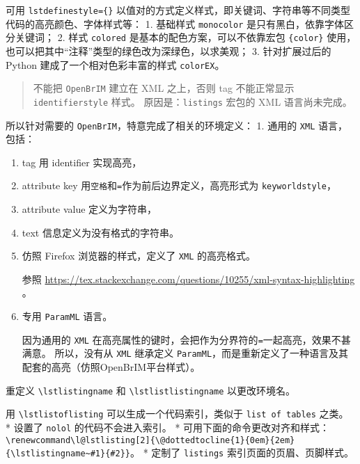 \documentclass[../Main/thesis.tex]{subfiles}
\begin{document}
可用 \texttt{lstdefinestyle=\{\}}
以值对的方式定义样式，即关键词、字符串等不同类型代码的高亮颜色、字体样式等：
1. 基础样式 \texttt{monocolor} 是只有黑白，依靠字体区分关键词； 2. 样式
\texttt{colored} 是基本的配色方案，可以不依靠宏包 \texttt{\{color\}}
使用，也可以把其中``注释''类型的绿色改为深绿色，以求美观； 3.
针对扩展过后的 Python 建成了一个相对色彩丰富的样式 \texttt{colorEX}。

\begin{quote}
不能把 \texttt{OpenBrIM} 建立在 XML 之上，否则 tag 不能正常显示
\texttt{identifierstyle} 样式。 原因是：\texttt{listings} 宏包的 XML
语言尚未完成。
\end{quote}

所以针对需要的 \texttt{OpenBrIM}，特意完成了相关的环境定义： 1. 通用的
\texttt{XML} 语言，包括：

\begin{enumerate}
\def\labelenumi{\arabic{enumi}.}
\item
  tag 用 identifier 实现高亮，
\item
  attribute key 用\texttt{空格}和\texttt{=}作为前后边界定义，高亮形式为
  \texttt{keyworldstyle}，
\item
  attribute value 定义为字符串，
\item
  text 信息定义为没有格式的字符串。
\item
  仿照 Firefox 浏览器的样式，定义了 \texttt{XML} 的高亮格式。

  参照
  \url{https://tex.stackexchange.com/questions/10255/xml-syntax-highlighting}
  。
\item
  专用 \texttt{ParamML} 语言。

  因为通用的 \texttt{XML}
  在高亮属性的键时，会把作为分界符的\texttt{=}一起高亮，效果不甚满意。
  所以，没有从 \texttt{XML} 继承定义
  \texttt{ParamML}，而是重新定义了一种语言及其配套的高亮（仿照OpenBrIM平台样式）。
\end{enumerate}

重定义 \texttt{\textbackslash{}lstlistingname} 和
\texttt{\textbackslash{}lstlistlistingname} 以更改环境名。

用 \texttt{\textbackslash{}lstlistoflisting}
可以生成一个代码索引，类似于 \texttt{list\ of\ tables} 之类。 * 设置了
\texttt{nolol} 的代码不会进入索引。 * 可用下面的命令更改对齐和样式：
\texttt{\textbackslash{}renewcommand\textbackslash{}l@lstlisting{[}2{]}\{\textbackslash{}@dottedtocline\{1\}\{0em\}\{2em\}\{\textbackslash{}lstlistingname\textasciitilde{}\#1\}\{\#2\}\}}。
* 定制了 \texttt{listings} 索引页面的页眉、页脚样式。
\end{document}
